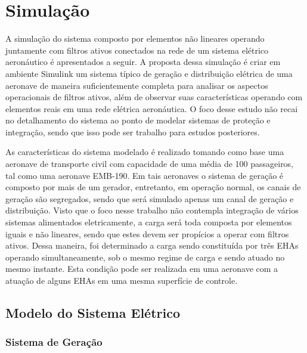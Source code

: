 \section{Simulação}

A simulação do sistema composto por elementos não lineares operando juntamente com filtros ativos conectados na rede de um sistema elétrico aeronáutico é apresentados a seguir. A proposta dessa simulação é criar em ambiente Simulink um sistema típico de geração e distribuição elétrica de uma aeronave de maneira suficientemente completa para analisar os aspectos operacionais de filtros ativos, além de observar suas características operando com elementos reais em uma rede elétrica aeronáutica. O foco desse estudo não recai no detalhamento do sistema ao ponto de modelar sistemas de proteção e integração, sendo que isso pode ser trabalho para estudos posteriores.

As características do sistema modelado é realizado tomando como base uma aeronave de transporte civil com capacidade de uma média de 100 passageiros, tal como uma aeronave EMB-190. Em tais aeronaves o sistema de geração é composto por mais de um gerador, entretanto, em operação normal, os canais de geração são segregados, sendo que será simulado apenas um canal de geração e distribuição. Visto que o foco nesse trabalho não contempla integração de vários sistemas alimentados eletricamente, a carga será toda composta por elementos iguais e não lineares, sendo que estes devem ser propícios a operar com filtros ativos. Dessa maneira, foi determinado a carga sendo constituída por três EHAs operando simultaneamente, sob o mesmo regime de carga e sendo atuado no mesmo instante. Esta condição pode ser realizada em uma aeronave com a atuação de alguns EHAs em uma mesma superfície de controle.

\subsection{Modelo do Sistema Elétrico}

\subsubsection{Sistema de Geração}

